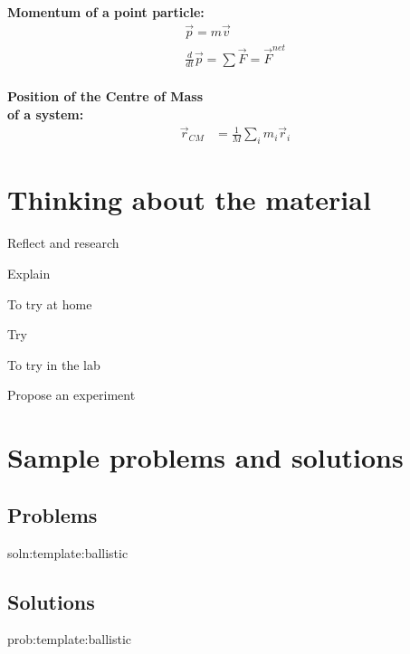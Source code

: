 \newpage
\begin{importantEquations}
\medskip
\begin{multicols}{2}
\textbf{Momentum of a point particle:}
\begin{align*}
\vec p = m\vec v \\
\frac{d}{dt}\vec p = \sum \vec F = \vec F^{net}
\end{align*}
\columnbreak
\\
\textbf{Position of the Centre of Mass \\ of a system:}
\begin{align*}
\vec r_{CM} &=\frac{1}{M}\sum_i m_i\vec r_i 
\end{align*}
\medskip
\end{multicols}
\end{importantEquations}

\newpage
\section{Thinking about the material}

\begin{chapteractivity}{Reflect and research}
{
\item Explain
}
\end{chapteractivity}

\begin{chapteractivity}{To try at home}
{
\item Try
}
\end{chapteractivity}

\begin{chapteractivity}{To try in the lab}
{
\item Propose an experiment
}
\end{chapteractivity}

\newpage
\section{Sample problems and solutions}
\subsection{Problems}
\begin{problem}{soln:template:ballistic}{\label{prob:template:ballistic} 

}
\end{problem}
\newpage
\subsection{Solutions}
\begin{solution}{prob:template:ballistic}\label{soln:template:ballistic}

\end{solution}

